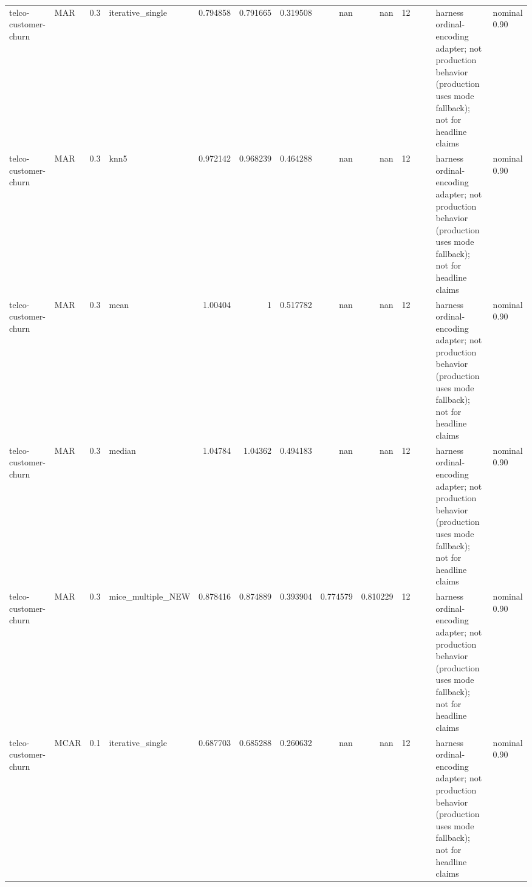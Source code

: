 \begin{table}[ht]
\begin{tabular}{llrlrrrrrrllll}
 telco-customer-churn & MAR         &         0.3 & iterative\_single  &       0.794858 &             0.791665 &                 0.319508 &                     nan        &                       nan        &        12 &                    &                                         & harness ordinal-encoding adapter; not production behavior (production uses mode fallback); not for headline claims & nominal 0.90              \\
 telco-customer-churn & MAR         &         0.3 & knn5              &       0.972142 &             0.968239 &                 0.464288 &                     nan        &                       nan        &        12 &                    &                                         & harness ordinal-encoding adapter; not production behavior (production uses mode fallback); not for headline claims & nominal 0.90              \\
 telco-customer-churn & MAR         &         0.3 & mean              &       1.00404  &             1        &                 0.517782 &                     nan        &                       nan        &        12 &                    &                                         & harness ordinal-encoding adapter; not production behavior (production uses mode fallback); not for headline claims & nominal 0.90              \\
 telco-customer-churn & MAR         &         0.3 & median            &       1.04784  &             1.04362  &                 0.494183 &                     nan        &                       nan        &        12 &                    &                                         & harness ordinal-encoding adapter; not production behavior (production uses mode fallback); not for headline claims & nominal 0.90              \\
 telco-customer-churn & MAR         &         0.3 & mice\_multiple\_NEW &       0.878416 &             0.874889 &                 0.393904 &                       0.774579 &                         0.810229 &        12 &                    &                                         & harness ordinal-encoding adapter; not production behavior (production uses mode fallback); not for headline claims & nominal 0.90              \\
 telco-customer-churn & MCAR        &         0.1 & iterative\_single  &       0.687703 &             0.685288 &                 0.260632 &                     nan        &                       nan        &        12 &                    &                                         & harness ordinal-encoding adapter; not production behavior (production uses mode fallback); not for headline claims & nominal 0.90              \\

\end{tabular}
\end{table}
